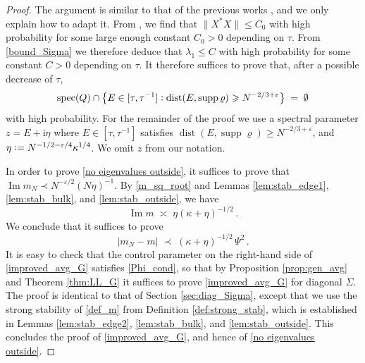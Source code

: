 \documentclass[11pt]{article} %
\numberwithin{equation}{section}
\numberwithin{figure}{section}
\theoremstyle{plain} %
\theoremstyle{definition} %
\newcommand{\ii}{\mathrm{i}}
\newcommand{\col}{\mathrel{\vcenter{\baselineskip0.75ex \lineskiplimit0pt \hbox{.}\hbox{.}}}}
\newcommand*{\deq}{\mathrel{\vcenter{\baselineskip0.65ex \lineskiplimit0pt \hbox{.}\hbox{.}}}=}
\renewcommand{\leq}{\leqslant}
\renewcommand{\geq}{\geqslant}
\renewcommand{\epsilon}{\varepsilon}
\newcommand{\hb}[1]{\bigl\{{#1}\bigr\}}
\newcommand{\abs}[1]{\lvert #1 \rvert}
\newcommand{\norm}[1]{\lVert #1 \rVert}
\DeclareMathOperator{\supp}{supp}
\DeclareMathOperator{\im}{Im}
\DeclareMathOperator{\dist}{dist}
\DeclareMathOperator{\spec}{spec}
\begin{document}
\begin{proof}
The argument is similar to that of the previous works \cite{EYY3, PY}, and we only explain how to adapt it.
From \cite[Theorem 2.10]{BEKYY}, we find that $\norm{X^* X} \leq C_0$ with high probability for some large enough constant $C_0 > 0$ depending on $\tau$. From \eqref{bound_Sigma} we therefore deduce that $\lambda_1 \leq C$ with high probability for some constant $C > 0$ depending on $\tau$. It therefore suffices to prove that, after a possible decrease of $\tau$,
\begin{equation} \label{no eigenvalues outside}
\spec(Q) \cap \hb{E \in [\tau, \tau^{-1}] \col \dist(E, \supp \varrho) \geq N^{-2/3 + \epsilon}} \;=\; \emptyset
\end{equation}
with high probability. For the remainder of the proof we use a spectral parameter $z = E + \ii \eta$ where $E \in [\tau, \tau^{-1}]$ satisfies $\dist(E, \supp \varrho) \geq N^{-2/3 + \epsilon}$, and $\eta \deq N^{-1/2 - \epsilon/4} \kappa^{1/4}$. We omit $z$ from our notation.

In order to prove \eqref{no eigenvalues outside}, it suffices to prove that $\im m_N \prec N^{-\epsilon/2} (N \eta)^{-1}$. By \eqref{m_sq_root} and Lemmas \ref{lem:stab_edge1}, \ref{lem:stab_bulk}, and \ref{lem:stab_outside}, we have
\begin{equation} \label{im_m_asymp}
\im m \;\asymp\; \eta (\kappa + \eta)^{-1/2}\,.
\end{equation}
We conclude that it suffices to prove
\begin{equation} \label{improved_avg_G}
\abs{m_N - m} \;\prec\; (\kappa + \eta)^{-1/2} \, \Psi^2\,.
\end{equation}
It is easy to check that the control parameter on the right-hand side of \eqref{improved_avg_G} satisfies \eqref{Phi_cond}, so that by Proposition \ref{prop:gen_avg} and Theorem \ref{thm:LL_G} it suffices to prove \eqref{improved_avg_G} for diagonal $\Sigma$. The proof is identical to that of Section \ref{sec:diag_Sigma}, except that we use the strong stability of \eqref{def_m} from Definition \ref{def:strong_stab}, which is established in Lemmas \ref{lem:stab_edge2}, \ref{lem:stab_bulk}, and \ref{lem:stab_outside}. This concludes the proof of \eqref{improved_avg_G}, and hence of \eqref{no eigenvalues outside}.


\end{proof}
\end{document}
